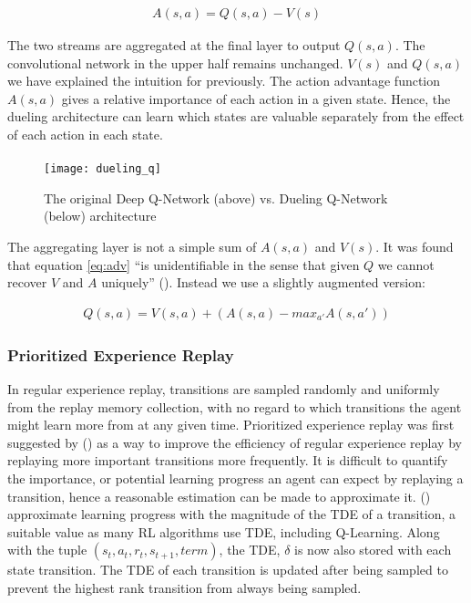 \begin{align}
    \label{eq:adv}
    A(s, a) =  Q(s, a) - V(s)
\end{align}

The two streams are aggregated at the final layer to output $Q(s, a)$. The convolutional network in the upper half remains unchanged. $V(s)$ and $Q(s, a)$ we have explained the intuition for previously. The action advantage function $A(s, a)$ gives a relative importance of each action in a given state. Hence, the dueling architecture can learn which states are valuable separately from the effect of each action in each state. \paragraph{}

\begin{figure}[h]
    \centering
    \texttt{[image: dueling\_q]}
    \caption{The original Deep Q-Network (above) vs. Dueling Q-Network (below) architecture}
\end{figure}

The aggregating layer is not a simple sum of $A(s, a)$ and $V(s)$. It was found that equation \ref{eq:adv} ``is unidentifiable in the sense that given $Q$ we cannot recover $V$ and $A$ uniquely'' (\citet{dueling}). Instead we use a slightly augmented version:

\begin{align}
    Q(s, a) = V(s, a) + (A(s, a) - max_{a'} A(s, a'))
\end{align}

\subsubsection{Prioritized Experience Replay}
In regular experience replay, transitions are sampled randomly and uniformly from the replay memory collection, with no regard to which transitions the agent might learn more from at any given time. Prioritized experience replay was first suggested by (\citet{prioritized}) as a way to improve the efficiency of regular experience replay by replaying more important transitions more frequently. It is difficult to quantify the importance, or potential learning progress an agent can expect by replaying a transition, hence a reasonable estimation can be made to approximate it. (\citet{prioritized}) approximate learning progress with the magnitude of the TDE of a transition, a suitable value as many RL algorithms use TDE, including Q-Learning. Along with the tuple $(s_t, a_t, r_{t}, s_{t+1}, term)$, the TDE, $\delta$ is now also stored with each state transition. The TDE of each transition is updated after being sampled to prevent the highest rank transition from always being sampled. \paragraph{}

